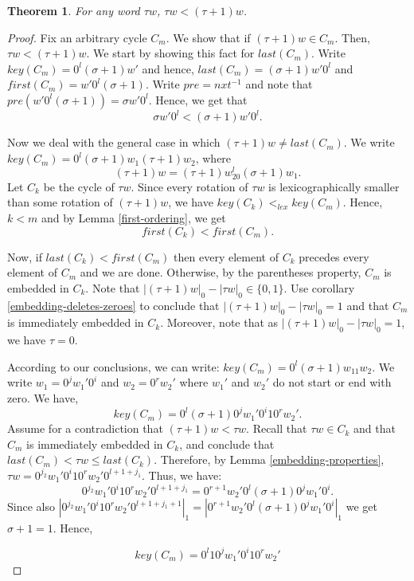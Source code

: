\documentclass{article}
\newtheorem{theorem}{Theorem}
\theoremstyle{definition}
\begin{document}
\begin{theorem}
	For any word $\tau w$, $\tau w<(\tau+1)w$.
\end{theorem}

\begin{proof}
	Fix an arbitrary cycle $C_m$. We show that if $(\tau+1)w\in C_m$. Then, $\tau w<(\tau+1)w$. We start by showing this fact for $last(C_m)$. Write $key(C_m)=0^l(\sigma+1)w'$ and hence, $last(C_m)=(\sigma+1)w'0^l$ and $first(C_m)=w'0^l(\sigma+1)$. Write $pre=nxt^{-1}$ and note that $pre(w'0^l(\sigma+1))=\sigma w'0^l$. Hence, we get that 
	$$\sigma w' 0^l<(\sigma+1)w'0^l.$$
	
	Now we deal with the general case in which $(\tau+1)w\neq last(C_m)$. We write 
	$key(C_m)=0^l(\sigma+1)w_1(\tau+1)w_2$, where $$(\tau+1)w=(\tau+1)w_20^l(\sigma+1)w_1.$$ Let $C_k$ be the cycle of $\tau w$. Since every rotation of $\tau w$ is lexicographically smaller than some rotation of $(\tau+1)w$, we have $key(C_k)<_{lex}key(C_m)$. Hence, $k<m$ and by Lemma \ref{first-ordering}, we get 
	$$first(C_k)<first(C_m).$$
	
	Now, if $last(C_k)<first(C_m)$ then every element of $C_k$ precedes every element of $C_m$ and we are done. Otherwise, by the parentheses property, $C_m$ is embedded in $C_k$. Note that $|(\tau+1)w|_0-|\tau w|_0\in\{0,1\}$. Use corollary \ref{embedding-deletes-zeroes} to conclude that $|(\tau+1)w|_0-|\tau w|_0=1$ and that $C_m$ is immediately embedded in $C_k$. Moreover, note that as $|(\tau+1)w|_0-|\tau w|_0=1$, we have $\tau=0$.
	
	According to our conclusions, we can write: $key(C_m)=0^l(\sigma+1)w_11w_2$. We write $w_1=0^jw_1'0^i$ and $w_2=0^rw_2'$ where $w_1'$ and $w_2'$ do not start or end with zero. We have,
	$$key(C_m)=0^l(\sigma+1)0^jw_1'0^i10^rw_2'.$$
	Assume for a contradiction that $(\tau+1)w<\tau w$. Recall that $\tau w\in C_k$ and that $C_m$ is immediately embedded in $C_k$, and conclude that $last(C_m)<\tau w\leq last(C_k)$. Therefore, by Lemma \ref{embedding-properties}, $\tau w=0^{j_2}w_1'0^i10^rw_2'0^{l+1+j_1}.$ Thus, we have:
	\begin{equation}
	\label{1}
	0^{j_2}w_1'0^i10^rw_2'0^{l+1+j_1}=0^{r+1}w_2'0^l(\sigma+1)0^jw_1'0^i.
	\end{equation}
	Since also $|0^{j_2}w_1'0^i10^rw_2'0^{l+1+j_1+1}|_1 = |0^{r+1}w_2'0^l(\sigma+1)0^jw_1'0^i|_1$ we get $\sigma+1=1$. Hence,
	
	\begin{equation}
	\label{2}
	key(C_m)=0^l10^jw_1'0^i10^rw_2'
	\end{equation}
	

\end{proof}
\end{document}
